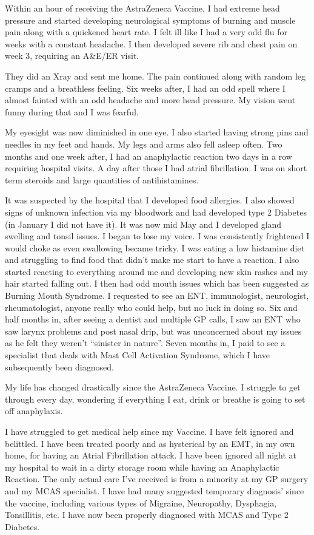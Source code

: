 Within an hour of receiving the AstraZeneca Vaccine, I had extreme head pressure
and started developing neurological symptoms of burning and muscle pain along
with a quickened heart rate. I felt ill like I had a very odd flu for weeks with
a constant headache. I then developed severe rib and chest pain on week 3,
requiring an A\&E/ER visit.

They did an Xray and sent me home. The pain continued along with random leg
cramps and a breathless feeling. Six weeks after, I had an odd spell where I
almost fainted with an odd headache and more head pressure. My vision went funny
during that and I was fearful.

My eyesight was now diminished in one eye. I also started having strong pins and
needles in my feet and hands. My legs and arms also fell asleep often. Two
months and one week after, I had an anaphylactic reaction two days in a row
requiring hospital visits. A day after those I had atrial fibrillation. I was on
short term steroids and large quantities of antihistamines.

It was suspected by the hospital that I developed food allergies. I also showed
signs of unknown infection via my bloodwork and had developed type 2 Diabetes
(in January I did not have it). It was now mid May and I developed gland
swelling and tonsil issues. I began to lose my voice. I was consistently
frightened I would choke as even swallowing became tricky. I was eating a low
histamine diet and struggling to find food that didn’t make me start to have a
reaction. I also started reacting to everything around me and developing new
skin rashes and my hair started falling out. I then had odd mouth issues which
has been suggested as Burning Mouth Syndrome. I requested to see an ENT,
immunologist, neurologist, rheumatologist, anyone really who could help, but no
luck in doing so. Six and half months in, after seeing a dentist and multiple GP
calls, I saw an ENT who saw larynx problems and post nasal drip, but was
unconcerned about my issues as he felt they weren’t “sinister in nature”. Seven
months in, I paid to see a specialist that deals with Mast Cell Activation
Syndrome, which I have subsequently been diagnosed.

My life has changed drastically since the AstraZeneca Vaccine. I struggle to get
through every day, wondering if everything I eat, drink or breathe is going to
set off anaphylaxis.

I have struggled to get medical help since my Vaccine. I have felt ignored and
belittled. I have been treated poorly and as hysterical by an EMT, in my own
home, for having an Atrial Fibrillation attack. I have been ignored all night at
my hospital to wait in a dirty storage room while having an Anaphylactic
Reaction. The only actual care I’ve received is from a minority at my GP surgery
and my MCAS specialist. I have had many suggested temporary diagnosis’ since the
vaccine, including various types of Migraine, Neuropathy, Dysphagia,
Tonsillitis, etc. I have now been properly diagnosed with MCAS and Type 2
Diabetes.

